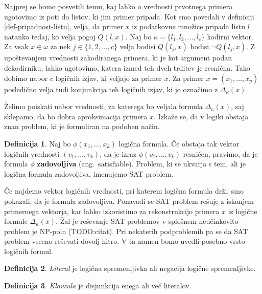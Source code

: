 \documentclass[12pt,a4paper,twoside]{article}
\theoremstyle{definition} %
\newtheorem{definicija}{Definicija}[section]
\theoremstyle{plain} %
\numberwithin{equation}{section}  %
\begin{document}
Najprej se bomo posvetili temu, kaj lahko o vrednosti prvotnega primera ugotovimo iz poti do listov, ki jim primer pripada.
Kot smo povedali v definiciji \ref{def-pripadnost-listu}, velja, da primer $x$ iz podatkovne množice pripada listu $l$ natanko tedaj, ko velja pogoj $Q(l,x)$.
Naj bo $\kappa=\{l_1, l_2, \ldots, l_c\}$ kodirni vektor.
Za vsak $x \in \omega$ za nek $j \in \{1,2,\ldots,c\}$ velja bodisi $Q(l_j,x)$ bodisi $\lnot Q(l_j,x)$.
Z upoštevanjem vrednosti zakodiranega primera, ki je kot argument podan dekodirniku, lahko ugotovimo, katera izmed teh dveh trditev je resnična.
Tako dobimo nabor $c$ logičnih izjav, ki veljajo za primer $x$.
Za primer $x=(x_1,\ldots,x_p)$ posledično velja tudi konjunkcija teh logičnih izjav, ki jo označimo z $\Delta_{\kappa}(x)$.

Želimo poiskati nabor vrednosti, za katerega bo veljala formula $\Delta_{\kappa}(x)$, saj sklepamo, da bo dobra aproksimacija primera $x$.
Izkaže se, da v logiki obstaja znan problem, ki je formuliran na podoben način.

\begin{definicija}
	Naj bo $\phi(x_1,\ldots,x_k)$ logična formula.
	Če obstaja tak vektor logičnih vrednosti $(v_1, \ldots, v_k)$, da je izraz $\phi(v_1, \ldots, v_k)$ resničen,
	pravimo, da je formula $\phi$ \textbf{zadovoljiva} (ang.~satisfiable).
	Problem, ki se ukvarja s tem, ali je logična formula zadovoljiva, imenujemo SAT problem. %
\end{definicija}
Če najdemo vektor logičnih vrednosti, pri katerem logična formula drži, smo pokazali, da je formula zadovoljiva.
Ponavadi se SAT problem rešuje z iskanjem primernega vektorja, kar lahko izkoristimo za rekonstrukcijo primera $x$ iz logične formule $\Delta_{\kappa}(x)$.
Žal je reševanje SAT problemov v splošnem neučinkovito - problem je NP-poln (TODO:citat).
Pri nekaterih podproblemih pa se da SAT problem vseeno reševati dovolj hitro. %
V ta namen bomo uvedli posebno vrsto logičnih formul.

\begin{definicija}
	\emph{Literal} je logična spremenljivka ali negacija logične spremenljivke.
\end{definicija}

\begin{definicija}
	\emph{Klavzula} je disjunkcija enega ali več literalov.
\end{definicija}
\end{document}
